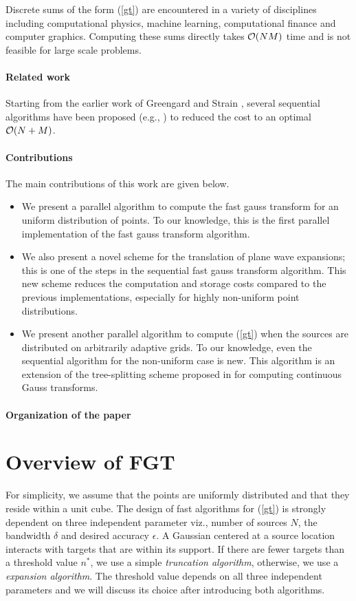 \documentclass[conference]{IEEEtran}
\begin{document}
Discrete sums of the form (\ref{gt}) are encountered in a variety of disciplines 
including computational physics, machine learning, computational finance and computer 
graphics. Computing these sums directly takes $\mathcal{O}(NM)$ time and is not feasible
for large scale problems. 

\paragraph{Related work}
Starting from the earlier work of Greengard and Strain \cite{fgt}, several sequential algorithms have 
been proposed (e.g.,  \cite{greengard98, duraiswami03, fggt}) to reduced the 
cost to an optimal $\mathcal{O}(N+M)$. 

\paragraph{Contributions}
The main contributions of this work are given below.
\begin{itemize} 
\item We present a parallel algorithm to compute the fast gauss transform for an 
uniform distribution of points. To our knowledge, this is the first parallel 
implementation of the fast gauss transform algorithm. 
\item We also present a novel scheme for the translation of plane wave expansions; this is one
of the steps in the sequential fast gauss transform algorithm. This new scheme reduces the 
computation and storage costs compared to the previous implementations, especially for highly
non-uniform point distributions.
\item We present another parallel algorithm to compute (\ref{gt}) when the sources are distributed
on arbitrarily adaptive grids. To our knowledge, even the sequential algorithm for the non-uniform case
 is new. This algorithm is an extension of the tree-splitting scheme proposed in \cite{veerapaneni08} 
 for computing continuous Gauss transforms. 
\end{itemize}

\paragraph{Organization of the paper}


\section{Overview of FGT}
For simplicity, we assume that the points are uniformly distributed and that they reside within a unit cube.
The design of fast algorithms for (\ref{gt}) is strongly dependent on three independent parameter viz., number of sources $N$, the bandwidth $\delta$ and desired accuracy $\epsilon$. A Gaussian centered at a source location interacts with targets that are within its support. If there are fewer targets than a threshold value $n^*$, we use a simple {\em truncation algorithm}, otherwise, we use a {\em expansion algorithm}. The threshold  value depends on all three independent parameters and we will discuss its choice after introducing both algorithms. 
\end{document}
